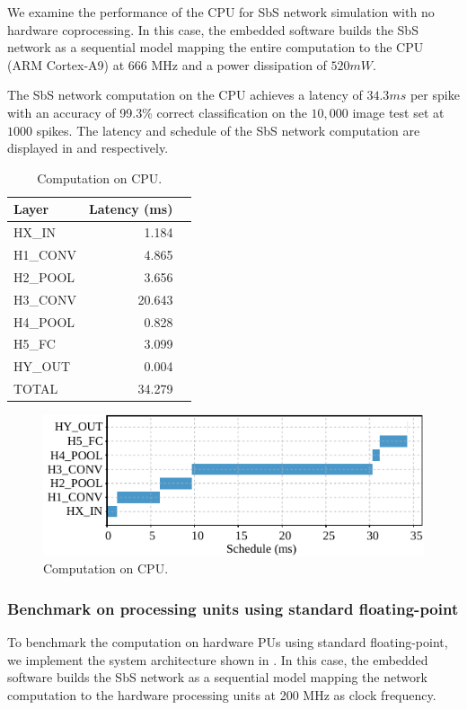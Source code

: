 We examine the performance of the CPU for SbS network simulation with no hardware coprocessing. In this case, the embedded software builds the SbS network as a sequential model mapping the entire computation to the CPU (ARM Cortex-A9) at 666 MHz and a power dissipation of $520 mW$.

The SbS network computation on the CPU achieves a latency of $34.3 ms$ per spike with an accuracy of 99.3\% correct classification on the $10,000$ image test set at $1000$ spikes. The latency and schedule of the SbS network computation are displayed in  and  respectively.

\begin{table}[!t]\centering
	\caption{Computation on CPU.}\label{tab:latency_sw}
	\scriptsize
\begin{tabular}{lrr}\toprule
	\textbf{Layer} &\textbf{Latency (ms)} \\\midrule
	HX\_IN &1.184 \\
	H1\_CONV &4.865 \\
	H2\_POOL &3.656 \\
	H3\_CONV &20.643 \\
	H4\_POOL &0.828 \\
	H5\_FC &3.099 \\
	HY\_OUT &0.004 \\
		
	TOTAL &34.279 \\
	\bottomrule
\end{tabular}
\end{table}

\begin{figure}[t!]
	\centering
	\includegraphics[width=1\columnwidth]{../figures/latency_sw.pdf}
	\caption{Computation on CPU.}
	\label{fig:latency_sw}
\end{figure}

\subsubsection{Benchmark on processing units using standard floating-point}
To benchmark the computation on hardware PUs using standard floating-point, we implement the system architecture shown in . In this case, the embedded software builds the SbS network as a sequential model mapping the network computation to the hardware processing units at 200 MHz as clock frequency.

